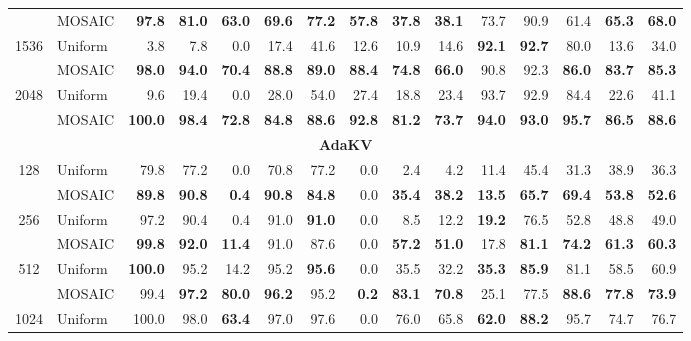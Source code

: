 \begin{table}[tp]
\begin{tabular}{@{} c l rrrrrrrrrrrrr @{}}
     & MOSAIC & \textbf{97.8} & \textbf{81.0} & \textbf{63.0} & \textbf{69.6} & \textbf{77.2} & \textbf{57.8} & \textbf{37.8} & \textbf{38.1} & 73.7 & 90.9 & 61.4 & \textbf{65.3} & \textbf{68.0} \\
    \cmidrule(l){1-15}
    \multirow{2}{*}{1536} & Uniform & 3.8 & 7.8 & 0.0 & 17.4 & 41.6 & 12.6 & 10.9 & 14.6 & \textbf{92.1} & \textbf{92.7} & 80.0 & 13.6 & 34.0 \\
     & MOSAIC & \textbf{98.0} & \textbf{94.0} & \textbf{70.4} & \textbf{88.8} & \textbf{89.0} & \textbf{88.4} & \textbf{74.8} & \textbf{66.0} & 90.8 & 92.3 & \textbf{86.0} & \textbf{83.7} & \textbf{85.3} \\
    \cmidrule(l){1-15}
    \multirow{2}{*}{2048} & Uniform & 9.6 & 19.4 & 0.0 & 28.0 & 54.0 & 27.4 & 18.8 & 23.4 & 93.7 & 92.9 & 84.4 & 22.6 & 41.1 \\
     & MOSAIC & \textbf{100.0} & \textbf{98.4} & \textbf{72.8} & \textbf{84.8} & \textbf{88.6} & \textbf{92.8} & \textbf{81.2} & \textbf{73.7} & \textbf{94.0} & \textbf{93.0} & \textbf{95.7} & \textbf{86.5} & \textbf{88.6} \\
    \midrule
    \multicolumn{15}{c}{\textbf{AdaKV}} \\
    \midrule
    \multirow{2}{*}{128} & Uniform & 79.8 & 77.2 & 0.0 & 70.8 & 77.2 & 0.0 & 2.4 & 4.2 & 11.4 & 45.4 & 31.3 & 38.9 & 36.3 \\
     & MOSAIC & \textbf{89.8} & \textbf{90.8} & \textbf{0.4} & \textbf{90.8} & \textbf{84.8} & 0.0 & \textbf{35.4} & \textbf{38.2} & \textbf{13.5} & \textbf{65.7} & \textbf{69.4} & \textbf{53.8} & \textbf{52.6} \\
    \cmidrule(l){1-15}
    \multirow{2}{*}{256} & Uniform & 97.2 & 90.4 & 0.4 & 91.0 & \textbf{91.0} & 0.0 & 8.5 & 12.2 & \textbf{19.2} & 76.5 & 52.8 & 48.8 & 49.0 \\
     & MOSAIC & \textbf{99.8} & \textbf{92.0} & \textbf{11.4} & 91.0 & 87.6 & 0.0 & \textbf{57.2} & \textbf{51.0} & 17.8 & \textbf{81.1} & \textbf{74.2} & \textbf{61.3} & \textbf{60.3} \\
    \cmidrule(l){1-15}
    \multirow{2}{*}{512} & Uniform & \textbf{100.0} & 95.2 & 14.2 & 95.2 & \textbf{95.6} & 0.0 & 35.5 & 32.2 & \textbf{35.3} & \textbf{85.9} & 81.1 & 58.5 & 60.9 \\
     & MOSAIC & 99.4 & \textbf{97.2} & \textbf{80.0} & \textbf{96.2} & 95.2 & \textbf{0.2} & \textbf{83.1} & \textbf{70.8} & 25.1 & 77.5 & \textbf{88.6} & \textbf{77.8} & \textbf{73.9} \\
    \cmidrule(l){1-15}
    \multirow{2}{*}{1024} & Uniform & 100.0 & 98.0 & \textbf{63.4} & 97.0 & 97.6 & 0.0 & 76.0 & 65.8 & \textbf{62.0} & \textbf{88.2} & 95.7 & 74.7 & 76.7 \\

\end{tabular}
\end{table}
